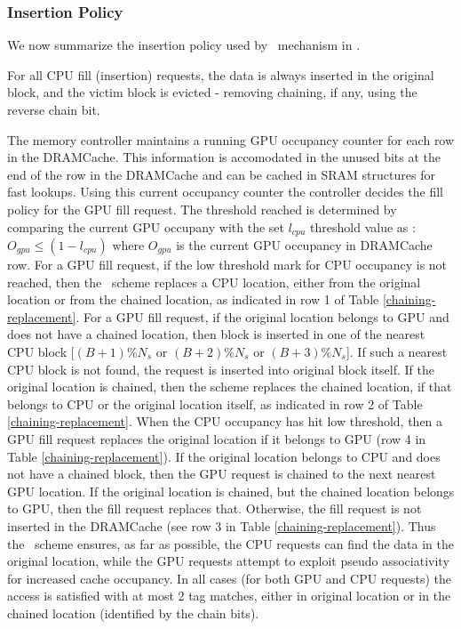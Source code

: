 \subsubsection{Insertion Policy}
\par We now summarize the insertion policy used by \chaining\ mechanism in \cachename. 
\par For all CPU fill (insertion) requests, the data is always inserted in the original block, and the victim block is evicted - removing chaining, if any, using the reverse chain bit. 
\par The memory controller maintains a running GPU occupancy counter for each row in the DRAMCache. This information is accomodated in the unused bits at the end of the row in the DRAMCache and can be cached in SRAM structures for fast lookups. Using this current occupancy counter the controller decides the fill policy for the GPU fill request. The threshold reached is determined by comparing the current GPU occupany with the set \textit{$l_{cpu}$} threshold value as : $O_{gpu}\le(1-l_{cpu})$ where $O_{gpu}$ is the current GPU occupancy in DRAMCache row. For a GPU fill request, if the low threshold mark for CPU occupancy is not reached, then the \chaining\ scheme replaces a CPU location, either from the original location or from the chained location, as indicated in row 1 of Table \ref{chaining-replacement}. For a GPU fill request, if the original location belongs to GPU and does not have a chained location, then block is inserted in one of the nearest CPU block [$(B+1)\%N_s$ or $(B+2)\%N_s$ or $(B+3)\%N_s$]. If such a nearest CPU block is not found, the request is inserted into original block itself. If the original location is chained, then the scheme replaces the chained location, if that belongs to CPU or the original location itself, as indicated in row 2 of Table \ref{chaining-replacement}. When the CPU occupancy has hit low threshold, then a GPU fill request replaces the original location if it belongs to GPU (row 4 in Table \ref{chaining-replacement}). If the original location belongs to CPU and does not have a chained block, then the GPU request is chained to the next nearest GPU location. If the original location is chained, but the chained location belongs to GPU, then the fill request replaces that. Otherwise, the fill request is not inserted in the DRAMCache (see row 3 in Table \ref{chaining-replacement}). Thus the \chaining\ scheme ensures, as far as possible, the CPU requests can find the data in the original location, while the GPU requests attempt to exploit pseudo associativity for increased cache occupancy. In all cases (for both GPU and CPU requests) the access is satisfied with at most 2 tag matches, either in original location or in the chained location (identified by the chain bits). 

